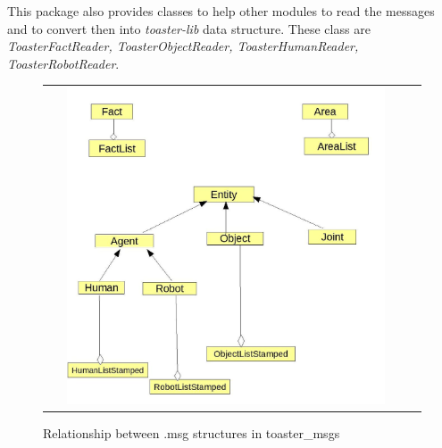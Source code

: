 \documentclass[a4paper]{article}
\begin{document}
This package also provides classes to help other modules to read the messages and to convert then into \textit{toaster-lib} data structure.
These class are \textit{ToasterFactReader, ToasterObjectReader, ToasterHumanReader, ToasterRobotReader}. 

 \begin{figure}[ht!]
 \centering
 \begin{tabular}{cc}
  \includegraphics[width=0.90\textwidth]{img/msgRelationship.jpg}
 \end{tabular}
 \caption{Relationship between .msg structures in toaster\_msgs}
 \label{fig:relationship}
 \end{figure}
 
 
\end{document}
